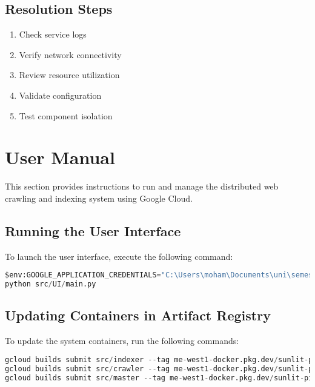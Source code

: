 \documentclass[12pt,a4paper]{report}
\begin{document}
\subsection{Resolution Steps}
\begin{enumerate}
\item Check service logs
\item Verify network connectivity
\item Review resource utilization
\item Validate configuration
\item Test component isolation
\end{enumerate}


\section{User Manual}
This section provides instructions to run and manage the distributed web crawling and indexing system using Google Cloud.
\subsection{Running the User Interface}
To launch the user interface, execute the following command:
\begin{lstlisting}[language=Python]
$env:GOOGLE_APPLICATION_CREDENTIALS="C:\Users\moham\Documents\uni\semesters\Spring 2025\distributed\project\sunlit-pixel-456910-j0-0f2843e49d73.json"
python src/UI/main.py
\end{lstlisting}
\subsection{Updating Containers in Artifact Registry}
To update the system containers, run the following commands:
\begin{lstlisting}[language=Python]
gcloud builds submit src/indexer --tag me-west1-docker.pkg.dev/sunlit-pixel-456910-j0/master-node/indexer-node:latest
gcloud builds submit src/crawler --tag me-west1-docker.pkg.dev/sunlit-pixel-456910-j0/master-node/crawler-node:latest
gcloud builds submit src/master --tag me-west1-docker.pkg.dev/sunlit-pixel-456910-j0/master-node/master-node:latest
\end{lstlisting}
\newpage
\end{document}
